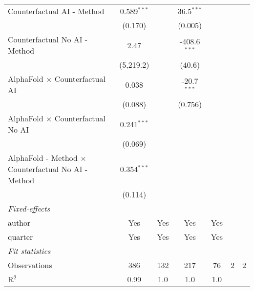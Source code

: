 \begin{tabular}{lcccccc}
   Counterfactual AI - Method                                 & 0.589$^{***}$ &         & 36.5$^{***}$   &                &     &   \\   
                                                              & (0.170)       &         & (0.005)        &                &     &   \\   
   Counterfactual No AI - Method                              & 2.47          &         & -408.6$^{***}$ &                &     &   \\   
                                                              & (5,219.2)     &         & (40.6)         &                &     &   \\   
   AlphaFold $\times$ Counterfactual AI                       & 0.038         &         & -20.7$^{***}$  &                &     &   \\   
                                                              & (0.088)       &         & (0.756)        &                &     &   \\   
   AlphaFold $\times$ Counterfactual No AI                    & 0.241$^{***}$ &         &                &                &     &   \\   
                                                              & (0.069)       &         &                &                &     &   \\   
   AlphaFold - Method $\times$ Counterfactual No AI - Method  & 0.354$^{***}$ &         &                &                &     &   \\   
                                                              & (0.114)       &         &                &                &     &   \\   
   \midrule
   \emph{Fixed-effects}\\
   author                                                     & Yes           & Yes     & Yes            & Yes            &     & \\  
   quarter                                                    & Yes           & Yes     & Yes            & Yes            &     & \\  
   \midrule
   \emph{Fit statistics}\\
   Observations                                               & 386           & 132     & 217            & 76             & 2   & 2\\  
   R$^2$                                                      & 0.99          & 1.0     & 1.0            & 1.0            &     & \\  

\end{tabular}

